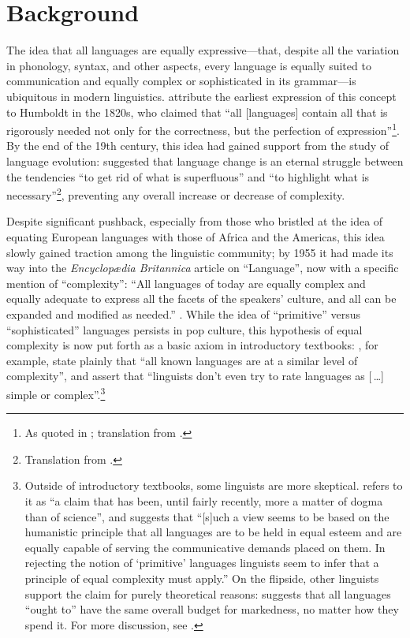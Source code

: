 \documentclass[12pt,twoside]{article}
\begin{document}
\section{Background}
\label{sec:bg}

The idea that all languages are equally expressive---that, despite all the variation in phonology, syntax, and other aspects, every language is equally suited to communication and equally complex or sophisticated in its grammar---is ubiquitous in modern linguistics. \citet{joseph} attribute the earliest expression of this concept to Humboldt in the 1820s, who claimed that ``all [languages] contain all that is rigorously needed not only for the correctness, but the perfection of expression''\footnote{As quoted in \cite[8]{rémusat}; translation from \cite[344]{joseph}.}. By the end of the 19th century, this idea had gained support from the study of language evolution: \citet[227]{passy} suggested that language change is an eternal struggle between the tendencies ``to get rid of what is superfluous'' and ``to highlight what is necessary''\footnote{Translation from \cite[352]{joseph}.}, preventing any overall increase or decrease of complexity.

Despite significant pushback, especially from those who bristled at the idea of equating European languages with those of Africa and the Americas, this idea slowly gained traction among the linguistic community; by 1955 it had made its way into the \emph{Encyclopædia Britannica} article on ``Language'', now with a specific mention of ``complexity'': ``All languages of today are equally complex and equally adequate to express all the facets of the speakers' culture, and all can be expanded and modified as needed.'' \citep[698]{trager}. While the idea of ``primitive'' versus ``sophisticated'' languages persists in pop culture, this hypothesis of equal complexity is now put forth as a basic axiom in introductory textbooks: \citet[8]{akmajian}, for example, state plainly that ``all known languages are at a similar level of complexity'', and \citet[8]{ogrady} assert that ``linguists don't even try to rate languages as [\,\ldots{}] simple or complex''.\footnote{Outside of introductory textbooks, some linguists are more skeptical. \citet[2]{shosted} refers to it as ``a claim that has been, until fairly recently, more a matter of dogma than of science'', and \citet[216]{maddieson} suggests that ``[s]uch a view seems to be based on the humanistic principle that all languages are to be held in equal esteem and are equally capable of serving the communicative demands placed on them. In rejecting the notion of `primitive' languages linguists seem to infer that a principle of equal complexity must apply.'' On the flipside, other linguists support the claim for purely theoretical reasons: \citet[165-166]{chomsky} suggests that all languages ``ought to'' have the same overall budget for markedness, no matter how they spend it. For more discussion, see \citet{joseph}.}
\end{document}
